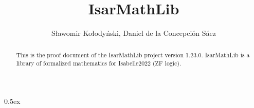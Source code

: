 \documentclass[11pt,a4paper]{article}
\begin{document}
\title{IsarMathLib}
\author{S\l awomir Ko\l ody\'{n}ski, Daniel de la Concepci\'{o}n S\'{a}ez}
\maketitle

\begin{abstract}
This is the proof document of the IsarMathLib project version 1.23.0. 
IsarMathLib is a library of formalized mathematics for Isabelle2022 (ZF logic). 
 
\end{abstract}

\tableofcontents

\parindent 0pt\parskip 0.5ex





\end{document}
